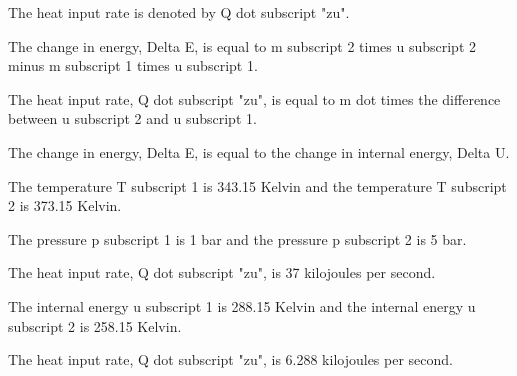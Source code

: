 The heat input rate is denoted by Q dot subscript "zu".

The change in energy, Delta E, is equal to m subscript 2 times u subscript 2 minus m subscript 1 times u subscript 1.

The heat input rate, Q dot subscript "zu", is equal to m dot times the difference between u subscript 2 and u subscript 1.

The change in energy, Delta E, is equal to the change in internal energy, Delta U.

The temperature T subscript 1 is 343.15 Kelvin and the temperature T subscript 2 is 373.15 Kelvin.

The pressure p subscript 1 is 1 bar and the pressure p subscript 2 is 5 bar.

The heat input rate, Q dot subscript "zu", is 37 kilojoules per second.

The internal energy u subscript 1 is 288.15 Kelvin and the internal energy u subscript 2 is 258.15 Kelvin.

The heat input rate, Q dot subscript "zu", is 6.288 kilojoules per second.